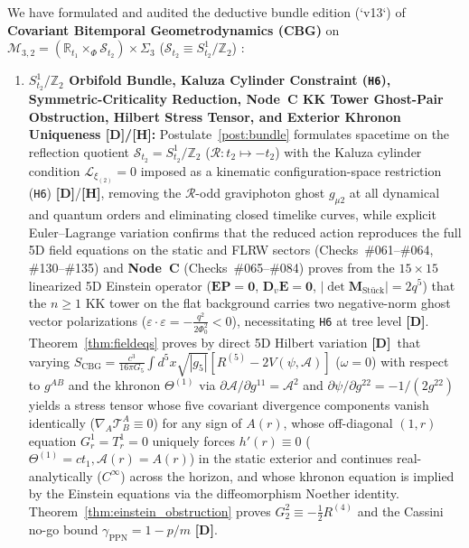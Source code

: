 \documentclass[11pt,a4paper]{article}
\newcommand{\catD}{\textbf{\textcolor{blue!75!black}{[D]}}}
\newcommand{\catH}{\textbf{\textcolor{orange!85!black}{[H]}}}
\theoremstyle{definition}
\theoremstyle{remark}
\begin{document}
We have formulated and audited the deductive bundle edition (`v13`) of \textbf{Covariant Bitemporal Geometrodynamics (CBG)} on $\mathcal{M}_{3,2} = (\mathbb{R}_{t_1} \times_{\Phi} \mathcal{S}_{t_2}) \times \Sigma_3$ ($\mathcal{S}_{t_2} \equiv S^1_{t_2}/\mathbb{Z}_2$) \cite{JV_Paper0,JV_Paper2,JV_Paper3,JV_Paper4,JV_Paper5}:

\begin{enumerate}
  \item \textbf{$S^1_{t_2}/\mathbb{Z}_2$ Orbifold Bundle, Kaluza Cylinder Constraint (\texttt{H6}), Symmetric-Criticality Reduction, Node~C KK Tower Ghost-Pair Obstruction, Hilbert Stress Tensor, and Exterior Khronon Uniqueness \catD/\catH:} Postulate~\ref{post:bundle} formulates spacetime on the reflection quotient $\mathcal{S}_{t_2} = S^1_{t_2}/\mathbb{Z}_2$ ($\mathcal{R}: t_2 \mapsto -t_2$) with the Kaluza cylinder condition $\mathcal{L}_{\xi_{(2)}} = 0$ imposed as a kinematic configuration-space restriction (\texttt{H6}) \catD/\catH, removing the $\mathcal{R}$-odd graviphoton ghost $g_{\mu 2}$ at all dynamical and quantum orders and eliminating closed timelike curves, while explicit Euler--Lagrange variation confirms that the reduced action reproduces the full 5D field equations on the static and FLRW sectors (Checks~\#061--\#064, \#130--\#135) and \textbf{Node~C} (Checks~\#065--\#084) proves from the $15\times 15$ linearized 5D Einstein operator ($\mathbf{E}\mathbf{P}=\mathbf{0}$, $\mathbf{D}_v\mathbf{E}=\mathbf{0}$, $|\det\mathbf{M}_{\text{St\"uck}}|=2q^5$) that the $n \ge 1$ KK tower on the flat background carries two negative-norm ghost vector polarizations ($\varepsilon\cdot\varepsilon = -\frac{q^2}{2\Phi_0^2} < 0$), necessitating \texttt{H6} at tree level \catD. Theorem~\ref{thm:fieldeqs} proves by direct 5D Hilbert variation \catD\ that varying $S_{\text{CBG}} = \frac{c^3}{16\pi G_5}\int d^5x\sqrt{|g_5|}[R^{(5)} - 2V(\psi,\mathcal{A})]$ ($\omega = 0$) with respect to $g^{AB}$ and the khronon $\Theta^{(1)}$ via $\partial\mathcal{A}/\partial g^{11} = \mathcal{A}^2$ and $\partial\psi/\partial g^{22} = -1/(2g^{22})$ yields a stress tensor whose five covariant divergence components vanish identically ($\nabla_A \mathcal{T}^A_B \equiv 0$) for any sign of $A(r)$, whose off-diagonal $(1,r)$ equation $G^1_r = T^1_r = 0$ uniquely forces $h'(r) \equiv 0$ ($\Theta^{(1)} = ct_1, \mathcal{A}(r) = A(r)$) in the static exterior and continues real-analytically ($C^\infty$) across the horizon, and whose khronon equation is implied by the Einstein equations via the diffeomorphism Noether identity. Theorem~\ref{thm:einstein_obstruction} proves $G^2_2 \equiv -\frac{1}{2}R^{(4)}$ and the Cassini no-go bound $\gamma_{\text{PPN}} = 1 - p/m$ \catD.

\end{enumerate}
\end{document}
